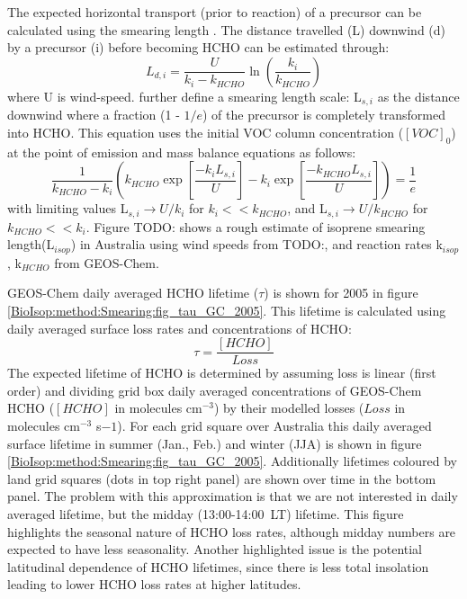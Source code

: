      The expected horizontal transport (prior to reaction) of a precursor can be calculated using the smearing length \parencite{Palmer2003}.
      The distance travelled (L) downwind (d) by a precursor (i) before becoming HCHO can be estimated through:
      \begin{equation*}
        L_{d,i} = \frac{U}{k_i - k_{HCHO}} \ln{ \left( \frac{k_i}{k_{HCHO}} \right) }
      \end{equation*}
      where U is wind-speed.
      \textcite{Palmer2003} further define a smearing length scale: L$_{s,i}$ as the distance downwind where a fraction (1 - $1/e$) of the precursor is completely transformed into HCHO.
      This equation uses the initial VOC column concentration ($[VOC]_0$) at the point of emission and mass balance equations as follows:
      \begin{equation}
      \frac{1}{k_{HCHO}-k_i} \left( k_{HCHO} \exp{ \left[ \frac{-k_i L_{s,i}}{U} \right]} -k_i \exp{ \left[ \frac{-k_{HCHO} L_{s,i}}{U} \right]} \right) = \frac{1}{e} 
      \end{equation}
      with limiting values L$_{s,i} \rightarrow U/k_i$ for $k_i << k_{HCHO}$, and L$_{s,i} \rightarrow U/k_{HCHO}$ for $k_{HCHO} << k_i$.
      Figure TODO: shows a rough estimate of isoprene smearing length(L$_{isop}$) in Australia using wind speeds from TODO:, and reaction rates k$_{isop}$, k$_{HCHO}$ from GEOS-Chem.
      
      GEOS-Chem daily averaged HCHO lifetime ($\tau$) is shown for 2005 in figure \ref{BioIsop:method:Smearing:fig_tau_GC_2005}.
      This lifetime is calculated using daily averaged surface loss rates and concentrations of HCHO:
      \begin{equation*}
      \tau = \frac{[HCHO]}{Loss}
      \end{equation*}
      The expected lifetime of HCHO is determined by assuming loss is linear (first order) and dividing grid box daily averaged concentrations of GEOS-Chem HCHO ($[HCHO]$ in molecules cm$^{-3}$) by their modelled losses ($Loss$ in molecules cm$^{-3}$ s${-1}$).
      For each grid square over Australia this daily averaged surface lifetime in summer (Jan., Feb.) and winter (JJA) is shown in figure \ref{BioIsop:method:Smearing:fig_tau_GC_2005}.
      Additionally lifetimes coloured by land grid squares (dots in top right panel) are shown over time in the bottom panel.
      The problem with this approximation is that we are not interested in daily averaged lifetime, but the midday (13:00-14:00~LT) lifetime.
      This figure highlights the seasonal nature of HCHO loss rates, although midday numbers are expected to have less seasonality.
      Another highlighted issue is the potential latitudinal dependence of HCHO lifetimes, since there is less total insolation leading to lower HCHO loss rates at higher latitudes.
      
